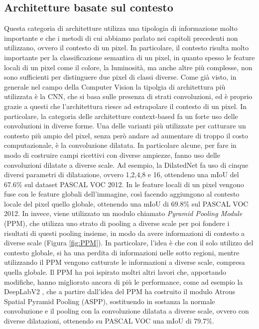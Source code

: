  
 \subsection{Architetture basate sul contesto}
 \label{context_based}
Questa categoria di architetture utilizza una tipologia di informazione molto importante e che i metodi di cui abbiamo parlato nei capitoli precedenti non utilizzano, ovvero il contesto di un pixel. In particolare, il contesto risulta molto importante per la classificazione semantica di un pixel, in quanto spesso le feature locali di un pixel come il colore, la luminosità, ma anche altre più complesse, non sono sufficienti per distinguere due pixel di classi diverse. Come già visto, in generale nel campo della Computer Vision la tipolgia di architettura più utilizzata è la CNN, che si basa sulle presenza di strati convoluzioni, ed è proprio grazie a questi che l'architettura riesce ad estrapolare il contesto di un pixel. In particolare, la categoria delle architetture context-based fa un forte uso delle convoluzioni in diverse forme. Una delle varianti più utilizzate per catturare un contesto più ampio del pixel, senza però andare ad aumentare di troppo il costo computazionale, è la convoluzione dilatata. In particolare alcune, per fare in modo di costruire campi ricettivi con diverse ampiezze, fanno uso delle convoluzioni dilatate a diverse scale. Ad esempio, la DilatedNet \cite{yu2015multi} fa uso di cinque diversi parametri di dilatazione, ovvero 1,2,4,8 e 16, ottendeno una mIoU del 67.6\% sul dataset PASCAL VOC 2012. In \cite{parsenet} le feature locali di un pixel vengono fuse con le feature globali dell'immagine, così facendo aggiungono al contesto locale del pixel quello globale, ottenendo una mIoU di 69.8\% sul PASCAL VOC 2012. In \cite{pspnet} invece, viene utilizzato un modulo chiamato \textit{Pyramid Pooling Module} (PPM), che utilizza uno strato di pooling a diverse scale per poi fondere i risultati di questi pooling insieme, in modo da avere informazioni di contesto a diverse scale (Figura \ref{fig:PPM}). In particolare, l'idea è che con il solo utilizzo del contesto globale, si ha una perdita di informazioni nelle sotto regioni, mentre utilizzando il PPM vengono catturate le informazioni a diverse scale, compresa quella globale. Il PPM ha poi ispirato moltri altri lavori che, apportando modifiche, hanno migliorato ancora di più le performance, come ad esempio la DeepLabV2 \cite{deeplabv2}, che  a partire dall'idea del PPM ha costruito il modulo Atrous Spatial Pyramid Pooling (ASPP), sostituendo in sostanza la normale convoluzione e il pooling con la convoluzione dilatata a diverse scale, ovvero con diverse dilatazioni, ottenendo su PASCAL VOC una mIoU di 79.7\%.

